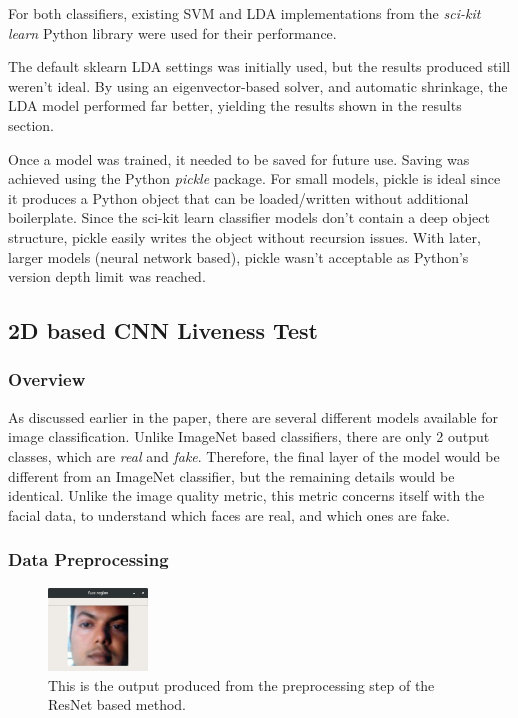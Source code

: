 \documentclass[10pt,a4paper]{article}
\begin{document}
            For both classifiers, existing SVM and LDA implementations from the \emph{sci-kit learn} Python library were used for their performance. 
            
            The default sklearn LDA settings was initially used, but the results produced still weren't ideal. By using an eigenvector-based solver, and automatic shrinkage, the LDA model performed far better, yielding the results
            shown in the results section.

            Once a model was trained, it needed to be saved for future use. Saving was achieved using the Python \emph{pickle} package. For small models, pickle is ideal since it produces a Python object that can be loaded/written without additional boilerplate. Since the sci-kit learn classifier models don't contain a deep object structure, pickle easily writes the object without recursion issues. With later, larger models (neural network based), pickle wasn't acceptable as Python's version depth limit was reached.
    
            
        \subsection{2D based CNN Liveness Test}
            \subsubsection{Overview}
            As discussed earlier in the paper, there are several different models available for image classification. Unlike ImageNet based classifiers, there are only 2 output classes, which are \emph{real} and \emph{fake}.
            Therefore, the final layer of the model would be different from an ImageNet classifier, but the remaining details would be identical. Unlike the image quality metric, this metric concerns itself with the facial data, to understand which faces
            are real, and which ones are fake.

            \subsubsection{Data Preprocessing}
            \begin{figure}
                \centering
                \includegraphics[width=100px]{FaceExtraction.png}
                \caption{This is the output produced from the preprocessing step of the ResNet based method.}
                \label{FaceExtraction}
            \end{figure}
            
\end{document}
